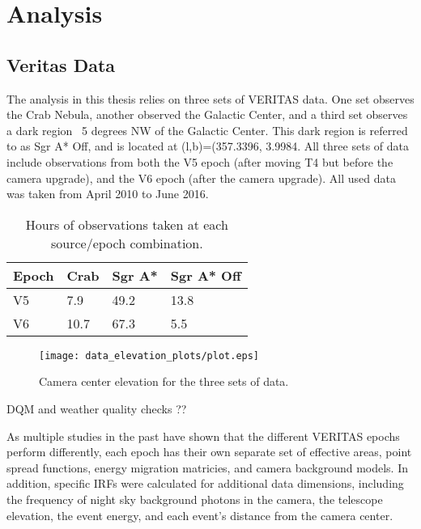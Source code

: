 \cleartooddpage[\thispagestyle{empty}]
\chapter{Analysis}

\section{Veritas Data}

The analysis in this thesis relies on three sets of VERITAS data.
One set observes the Crab Nebula, another observed the Galactic Center, and a third set observes a dark region ~5 degrees NW of the Galactic Center.
This dark region is referred to as  Sgr A* Off, and is located at (l,b)=(357.3396\degree, 3.9984\degree .
All three sets of data include observations from both the V5 epoch (after moving T4 but before the camera upgrade), and the V6 epoch (after the camera upgrade).
All used data was taken from April 2010 to June 2016.

\begin{table}[]
\centering
\caption{Hours of observations taken at each source/epoch combination.}
\label{my-label}
\begin{tabular}{|l|l|l|l|}
\hline
\textbf{Epoch} & \textbf{Crab} & \textbf{Sgr A*} & \textbf{Sgr A* Off} \\ \hline
V5             & 7.9           & 49.2            & 13.8                \\ \hline
V6             & 10.7          & 67.3            & 5.5                 \\ \hline
\end{tabular}
\end{table}

\begin{figure}[ht]
  \begin{center}
    \texttt{[image: data\_elevation\_plots/plot.eps]}
    \caption[VERITAS Data Elevation Exposure]{Camera center elevation for the three sets of data.}\label{fig:datapointingelevations}
  \end{center}
\end{figure}

DQM and weather quality checks ??

As multiple studies in the past have shown that the different VERITAS epochs perform differently, each epoch has their own separate set of effective areas, point spread functions, energy migration matricies, and camera background models.
In addition, specific IRFs were calculated for additional data dimensions, including the frequency of night sky background photons in the camera, the telescope elevation, the event energy, and each event's distance from the camera center.

